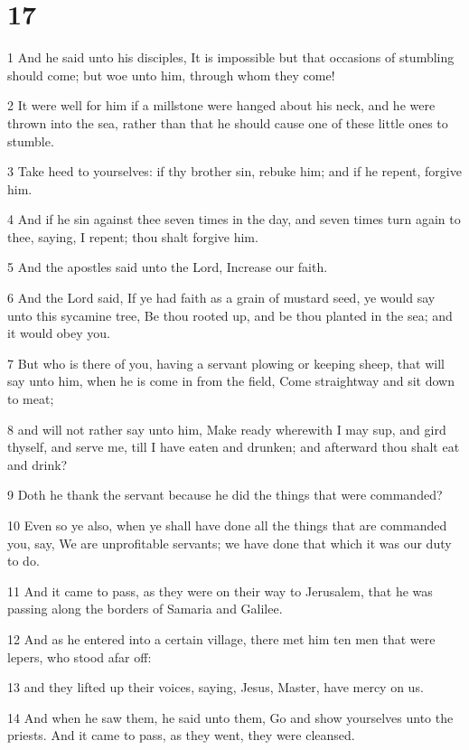 \chapter{17}

\par 1 And he said unto his disciples, It is impossible but that occasions of stumbling should come; but woe unto him, through whom they come!
\par 2 It were well for him if a millstone were hanged about his neck, and he were thrown into the sea, rather than that he should cause one of these little ones to stumble.
\par 3 Take heed to yourselves: if thy brother sin, rebuke him; and if he repent, forgive him.
\par 4 And if he sin against thee seven times in the day, and seven times turn again to thee, saying, I repent; thou shalt forgive him.
\par 5 And the apostles said unto the Lord, Increase our faith.
\par 6 And the Lord said, If ye had faith as a grain of mustard seed, ye would say unto this sycamine tree, Be thou rooted up, and be thou planted in the sea; and it would obey you.
\par 7 But who is there of you, having a servant plowing or keeping sheep, that will say unto him, when he is come in from the field, Come straightway and sit down to meat;
\par 8 and will not rather say unto him, Make ready wherewith I may sup, and gird thyself, and serve me, till I have eaten and drunken; and afterward thou shalt eat and drink?
\par 9 Doth he thank the servant because he did the things that were commanded?
\par 10 Even so ye also, when ye shall have done all the things that are commanded you, say, We are unprofitable servants; we have done that which it was our duty to do.
\par 11 And it came to pass, as they were on their way to Jerusalem, that he was passing along the borders of Samaria and Galilee.
\par 12 And as he entered into a certain village, there met him ten men that were lepers, who stood afar off:
\par 13 and they lifted up their voices, saying, Jesus, Master, have mercy on us.
\par 14 And when he saw them, he said unto them, Go and show yourselves unto the priests. And it came to pass, as they went, they were cleansed.
